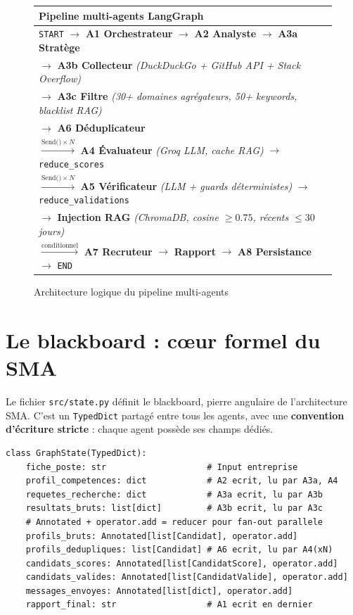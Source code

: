 \documentclass[12pt,a4paper]{report}
\begin{document}
\begin{figure}[H]
\centering
\begin{tabularx}{\textwidth}{X}
\toprule
\textbf{Pipeline multi-agents LangGraph} \\
\midrule
\texttt{START} $\to$ \textbf{A1 Orchestrateur} $\to$ \textbf{A2 Analyste}
$\to$ \textbf{A3a Stratège} \\
$\to$ \textbf{A3b Collecteur} \textit{(DuckDuckGo + GitHub API + Stack Overflow)} \\
$\to$ \textbf{A3c Filtre} \textit{(30+ domaines agrégateurs, 50+ keywords, blacklist RAG)} \\
$\to$ \textbf{A6 Déduplicateur} \\
$\xrightarrow{\text{Send()}\times N}$ \textbf{A4 Évaluateur} \textit{(Groq LLM, cache RAG)} $\to$ \texttt{reduce\_scores} \\
$\xrightarrow{\text{Send()}\times N}$ \textbf{A5 Vérificateur} \textit{(LLM + guards déterministes)} $\to$ \texttt{reduce\_validations} \\
$\to$ \textbf{Injection RAG} \textit{(ChromaDB, cosine $\geq 0.75$, récents $\leq 30$ jours)} \\
$\xrightarrow{\text{conditionnel}}$ \textbf{A7 Recruteur} $\to$ \textbf{Rapport} $\to$ \textbf{A8 Persistance} $\to$ \texttt{END} \\
\bottomrule
\end{tabularx}
\caption{Architecture logique du pipeline multi-agents}
\label{fig:pipeline}
\end{figure}

\section{Le blackboard : cœur formel du SMA}

Le fichier \texttt{src/state.py} définit le blackboard, pierre angulaire de
l'architecture SMA. C'est un \texttt{TypedDict} partagé entre tous les agents, avec
une \textbf{convention d'écriture stricte} : chaque agent possède ses champs dédiés.

\begin{lstlisting}[caption={src/state.py --- Blackboard TypedDict avec reducers}]
class GraphState(TypedDict):
    fiche_poste: str                    # Input entreprise
    profil_competences: dict            # A2 ecrit, lu par A3a, A4
    requetes_recherche: dict            # A3a ecrit, lu par A3b
    resultats_bruts: list[dict]         # A3b ecrit, lu par A3c
    # Annotated + operator.add = reducer pour fan-out parallele
    profils_bruts: Annotated[list[Candidat], operator.add]
    profils_dedupliques: list[Candidat] # A6 ecrit, lu par A4(xN)
    candidats_scores: Annotated[list[CandidatScore], operator.add]
    candidats_valides: Annotated[list[CandidatValide], operator.add]
    messages_envoyes: Annotated[list[dict], operator.add]
    rapport_final: str                  # A1 ecrit en dernier
\end{lstlisting}
\end{document}

